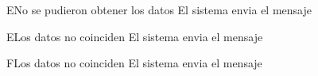 		\begin{UCtrayectoriaA}{E}{No se pudieron obtener los datos}
			\UCpaso[\UCsist] El sistema envia el mensaje  

		\end{UCtrayectoriaA}		
		
		
		
		\begin{UCtrayectoriaA}{E}{Los datos no coinciden}
			\UCpaso[\UCsist] El sistema envia el mensaje  

		\end{UCtrayectoriaA}
		

		\begin{UCtrayectoriaA}{F}{Los datos no coinciden}
			\UCpaso[\UCsist] El sistema envia el mensaje  

		\end{UCtrayectoriaA}
		
		
		
		
		
